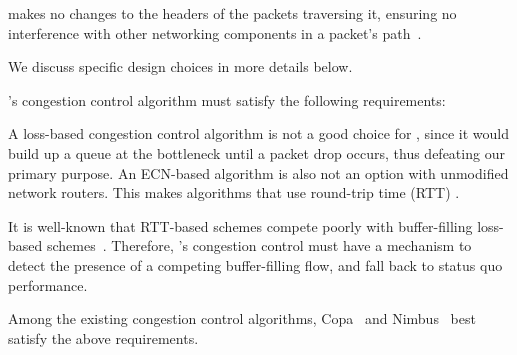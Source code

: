  \name makes no changes to the headers of the packets traversing it, ensuring no interference with other networking components in a packet's path~\cite{mboxbadness, ipoptions, quic}.

\vspace{5pt}
\noindent We discuss specific design choices in more details below. 

\name's congestion control algorithm must satisfy the following requirements: 

 A loss-based congestion control algorithm is not a good choice for \name, since it would build up a queue at the bottleneck until a packet drop occurs, thus defeating our primary purpose. %
An ECN-based algorithm is also not an option with unmodified network routers. This makes algorithms that use round-trip time (RTT) .

 It is well-known that RTT-based schemes compete poorly with buffer-filling loss-based schemes~\cite{nimbus, copa, timely}. Therefore, \name's congestion control must have a mechanism to detect the presence of a competing buffer-filling flow, and fall back to status quo performance. 

Among the existing congestion control algorithms, Copa~\cite{copa} and Nimbus~\cite{nimbus} best satisfy the above requirements.  




